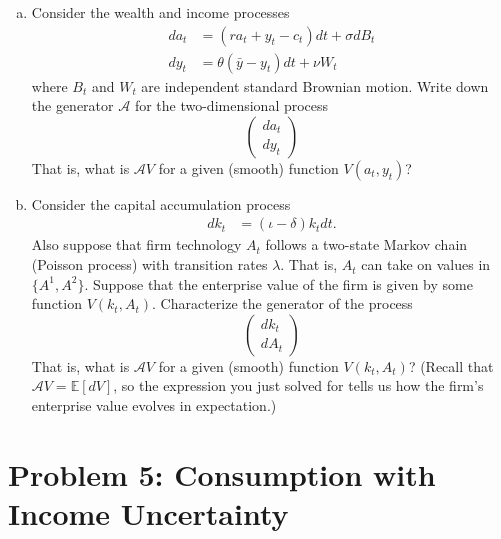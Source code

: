 \documentclass[11pt]{extarticle}
\theoremstyle{plain}
\theoremstyle{definition}
\begin{document}
\vspace{4mm}
\begin{enumerate}[(a)]
\item Consider the wealth and income processes 
\begin{align*}
	da_t &= (ra_t + y_t - c_t)dt + \sigma dB_t \\
	dy_t &= \theta (\bar y - y_t) dt + \nu W_t
\end{align*}
where $B_t$ and $W_t$ are independent standard Brownian motion. Write down the generator $\mathcal A$ for the two-dimensional process
\begin{equation*}
	\begin{pmatrix}
		d a_t \\
		d y_t 
	\end{pmatrix}
\end{equation*}
That is, what is $\mathcal A V$ for a given (smooth) function $V(a_t, y_t)$?

\item Consider the capital accumulation process
\begin{align*}
	dk_t &= (\iota - \delta) k_t dt. 
\end{align*}
Also suppose that firm technology $A_t$ follows a two-state Markov chain (Poisson process) with transition rates $\lambda$. That is, $A_t$ can take on values in $\{A^1, A^2\}$. Suppose that the enterprise value of the firm is given by some function $V(k_t, A_t)$. Characterize the generator of the process
\begin{equation*}
	\begin{pmatrix}
		d k_t \\
		d A_t 
	\end{pmatrix}
\end{equation*}
That is, what is $\mathcal A V$ for a given (smooth) function $V(k_t, A_t)$? (Recall that $\mathcal A V = \mathbb E[d V]$, so the expression you just solved for tells us how the firm's enterprise value evolves in expectation.)

\end{enumerate}



\vspace{5mm}
\section*{Problem 5: Consumption with Income Uncertainty}
\end{document}
